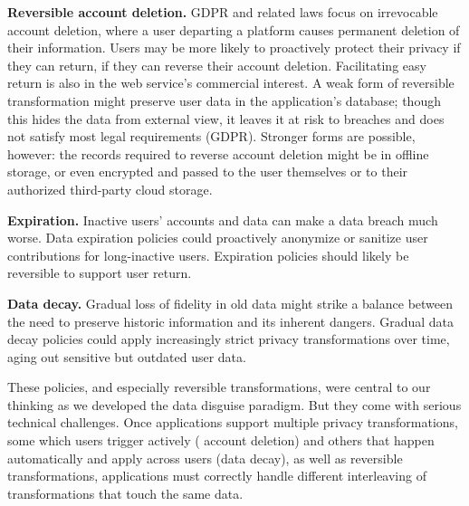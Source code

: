 \textbf{Reversible account deletion.}
%
GDPR and related laws focus on irrevocable account deletion, where
a user departing a platform causes permanent deletion of their information.
%
Users may be more likely to proactively protect their privacy if they
can return, \ie if they can reverse their account deletion.
%
Facilitating easy return is also in the web service's commercial interest.
%
A weak form of reversible transformation might preserve user data in the
application's database; though this hides the data from external view,
it leaves it at risk to breaches and does not satisfy most legal requirements
(\eg GDPR).
%
Stronger forms are possible, however: the records required to reverse account
deletion might be in offline storage, or even encrypted and passed to the
user themselves or to their authorized third-party cloud storage.
%


\textbf{Expiration.}
%
Inactive users' accounts and data can make a data breach much worse.
%
Data expiration policies could proactively anonymize or sanitize user
contributions for long-inactive users.
%
Expiration policies should likely be reversible to support user return.
%

\textbf{Data decay.}
%
Gradual loss of fidelity in old data might strike a balance between the need
to preserve historic information and its inherent dangers.
%
Gradual data decay policies could apply increasingly strict privacy
transformations over time, aging out sensitive but outdated user data.
%

%
These policies, and especially reversible transformations, were central to our
thinking as we developed the data disguise paradigm.
%
But they come with serious technical challenges. Once applications support
multiple privacy trans\-form\-ations, some which users trigger actively (\eg
account deletion) and others that happen automatically and apply across users
(\eg data decay), as well as reversible transformations, applications must correctly
handle different interleaving of transformations that touch the same data.
%


